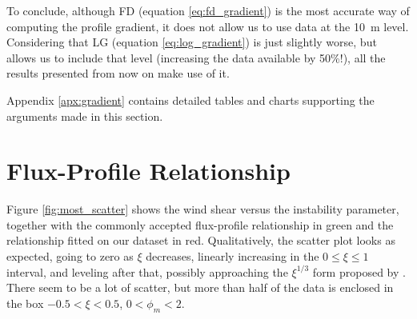\documentclass[a4paper,11pt]{kth-mag}
\begin{document}
To conclude, although FD (equation \ref{eq:fd_gradient}) is the most accurate way of computing the profile gradient, it does not allow us to use data at the \SI{10}{\meter} level. Considering that LG (equation \ref{eq:log_gradient}) is just slightly worse, but allows us to include that level (increasing the data available by 50\%!), all the results presented from now on make use of it.

Appendix \ref{apx:gradient} contains detailed tables and charts supporting the arguments made in this section.


\section{Flux-Profile Relationship}
\label{sec:most_res}
Figure \ref{fig:most_scatter} shows the wind shear versus the instability parameter, together with the commonly accepted flux-profile relationship in green and the relationship fitted on our dataset in red. Qualitatively, the scatter plot looks as expected, going to zero as $\xi$ decreases, linearly increasing in the $0\leq\xi\leq1$ interval, and leveling after that, possibly approaching the $\xi^{1/3}$ form proposed by \cite{sheba_phim}. There seem to be a lot of scatter, but more than half of the data is enclosed in the box $-0.5<\xi<0.5$, $0<\phi_m<2$.
\end{document}
